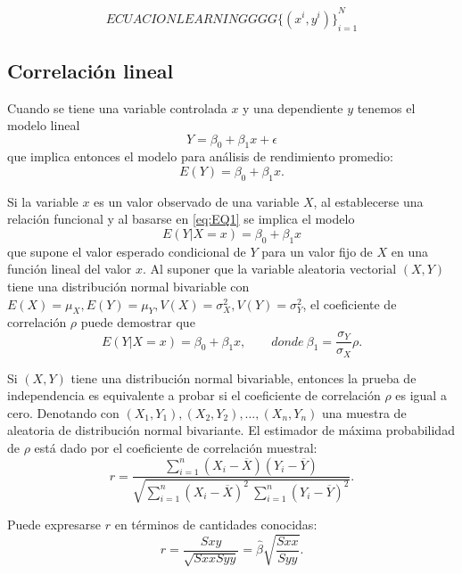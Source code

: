 \documentclass[letterpaper]{article}
\begin{document}
\begin{equation}
ECUACION LEARNINGGGG {\{(x^i,y^i)\}}_{i=1}^{N}
\end{equation}

\subsection {Correlación lineal}
Cuando se tiene una variable controlada $x$ y una dependiente $y$ tenemos el modelo lineal
\begin{equation}
Y=\beta_0+\beta_1x+\epsilon
\end{equation}
que implica entonces el modelo para análisis de rendimiento promedio:
\begin{equation}\label{eq:EQ1}
E(Y)=\beta_0+\beta_1x.
\end{equation}

Si la variable $x$ es un valor observado de una variable $X$, al establecerse una relación funcional y al basarse en \eqref{eq:EQ1}
se implica el modelo
\begin{equation}
E(Y|X=x)=\beta_0+\beta_1x
\end{equation}
que supone el valor esperado condicional de $Y$ para un valor fijo de $X$ en una función lineal del valor $x$. Al suponer que la variable aleatoria vectorial $(X, Y)$ tiene una distribución normal bivariable con $E(X)=\mu_X, E(Y)=\mu_Y, V(X)=\sigma^2_X, V(Y)=\sigma^2_Y$, el coeficiente de correlación $\rho$ puede demostrar que
\begin{equation}
E(Y|X=x)=\beta_0+\beta_1x,\qquad donde\ \beta_1=\frac{\sigma_Y}{\sigma_X}\rho.
\end{equation}

Si $(X, Y)$ tiene una distribución normal bivariable, entonces la prueba de independencia es equivalente a probar si el coeficiente de correlación $\rho$ es igual a cero. Denotando con $(X_1, Y_1), (X_2, Y_2),\ldots , (X_n, Y_n)$ una muestra de aleatoria de distribución normal bivariante. El estimador de máxima probabilidad de $\rho$ está dado por el coeficiente de correlación muestral:
\begin{equation}
r=\frac{\sum_{i=1}^{n}(X_i-\overline{X})(Y_i-\overline{Y})}{\sqrt{\sum_{i=1}^{n}(X_i-\overline{X})^2\ \sum_{i=1}^{n}(Y_i-\overline{Y})^2}}.
\end{equation}

Puede expresarse $r$ en términos de cantidades conocidas:
\begin{equation}
r=\frac{S{xy}}{\sqrt{S{xx}S{yy}}}=\hat{\beta}\sqrt{\frac{S{xx}}{S{yy}}}.
\end{equation}
\end{document}
